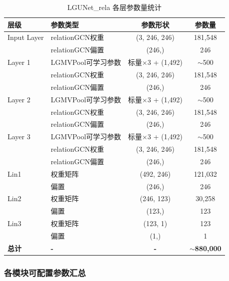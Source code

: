 \documentclass[UTF8, a4paper, 12pt]{article}
\begin{document}
\begin{table}[htbp]
\centering
\caption{LGUNet\_rela 各层参数量统计}
\label{tab:layer_params}
\begin{tabular}{llcc}
\toprule
层级 & 参数类型 & 参数形状 & 参数量 \\
\midrule
Input Layer & relationGCN权重 & (3, 246, 246) & 181,548 \\
            & relationGCN偏置 & (246,) & 246 \\
\midrule
Layer 1 & LGMVPool可学习参数 & 标量$\times$3 + (1,492) & $\sim$500 \\
        & relationGCN权重 & (3, 246, 246) & 181,548 \\
        & relationGCN偏置 & (246,) & 246 \\
\midrule
Layer 2 & LGMVPool可学习参数 & 标量$\times$3 + (1,492) & $\sim$500 \\
        & relationGCN权重 & (3, 246, 246) & 181,548 \\
        & relationGCN偏置 & (246,) & 246 \\
\midrule
Layer 3 & LGMVPool可学习参数 & 标量$\times$3 + (1,492) & $\sim$500 \\
        & relationGCN权重 & (3, 246, 246) & 181,548 \\
        & relationGCN偏置 & (246,) & 246 \\
\midrule
\midrule
Lin1 & 权重矩阵 & (492, 246) & 121,032 \\
     & 偏置 & (246,) & 246 \\
\midrule
Lin2 & 权重矩阵 & (246, 123) & 30,258 \\
     & 偏置 & (123,) & 123 \\
\midrule
Lin3 & 权重矩阵 & (123, 1) & 123 \\
     & 偏置 & (1,) & 1 \\
\midrule
\midrule
\textbf{总计} & \textbf{-} & \textbf{-} & \textbf{$\sim$880,000} \\
\bottomrule
\end{tabular}
\end{table}

\subsubsection{各模块可配置参数汇总}
\end{document}
